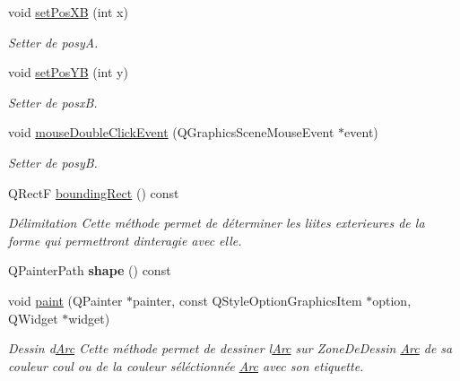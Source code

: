\begin{DoxyCompactItemize}
void \hyperlink{classQArc_aa70cb618a90df9b27e257f21168c95dd}{set\+Pos\+XB} (int x)
\begin{DoxyCompactList}\small\item\em Setter de posyA. \end{DoxyCompactList}\item 
\mbox{\label{classQArc_a348f3321ab0dd439098d14c8f424bd76}} 
void \hyperlink{classQArc_a348f3321ab0dd439098d14c8f424bd76}{set\+Pos\+YB} (int y)
\begin{DoxyCompactList}\small\item\em Setter de posxB. \end{DoxyCompactList}\item 
void \hyperlink{classQArc_a33187e6b256b9a1cbc280f415f3d6152}{mouse\+Double\+Click\+Event} (Q\+Graphics\+Scene\+Mouse\+Event $\ast$event)
\begin{DoxyCompactList}\small\item\em Setter de posyB. \end{DoxyCompactList}\item 
\mbox{\label{classQArc_a01cd319d49022b546d0cfb684eb9b033}} 
Q\+RectF \hyperlink{classQArc_a01cd319d49022b546d0cfb684eb9b033}{bounding\+Rect} () const
\begin{DoxyCompactList}\small\item\em D\'{e}limitation Cette m\'{e}thode permet de d\'{e}terminer les liites exterieures de la forme qui permettront d\textquotesingle{}interagie avec elle. \end{DoxyCompactList}\item 
\mbox{\label{classQArc_a4a991d237426cd2823c2f40f9ab0d09e}} 
Q\+Painter\+Path {\bfseries shape} () const
\item 
\mbox{\label{classQArc_a27313f655f69cd5e802944132fe7ee04}} 
void \hyperlink{classQArc_a27313f655f69cd5e802944132fe7ee04}{paint} (Q\+Painter $\ast$painter, const Q\+Style\+Option\+Graphics\+Item $\ast$option, Q\+Widget $\ast$widget)
\begin{DoxyCompactList}\small\item\em Dessin d\textquotesingle{}\hyperlink{classArc}{Arc} Cette m\'{e}thode permet de dessiner l\textquotesingle{}\hyperlink{classArc}{Arc} sur Zone\+De\+Dessin \hyperlink{classArc}{Arc} de sa couleur coul ou de la couleur s\'{e}l\'{e}ctionn\'{e}e \hyperlink{classArc}{Arc} avec son etiquette. \end{DoxyCompactList}\end{DoxyCompactItemize}


